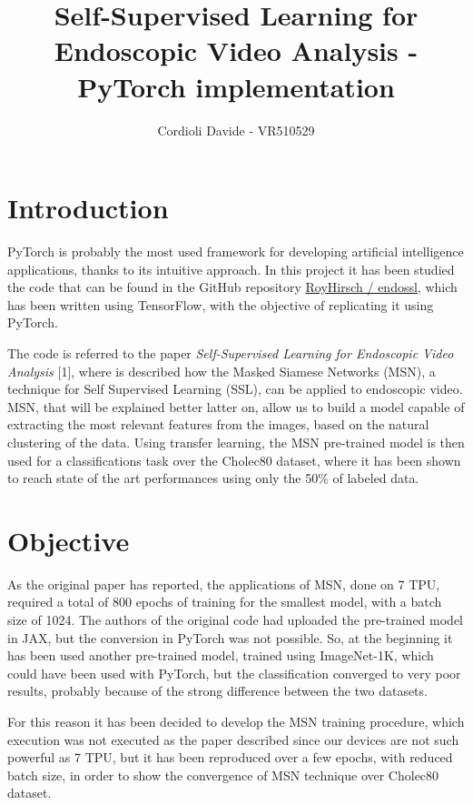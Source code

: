 \documentclass[column]{article}
\title{Self-Supervised Learning for Endoscopic Video Analysis - PyTorch implementation}
\author{Cordioli Davide - VR510529}
\date{}
\begin{document}
	
	\maketitle
	
	\begin{multicols}{2}
		
	\section{Introduction}
	
	PyTorch is probably the most used framework for developing artificial intelligence applications, thanks to its intuitive approach. In this project it has been studied the code that can be found in the GitHub repository  \href{https://github.com/royhirsch/endossl}{RoyHirsch / endossl}, which has been written using TensorFlow, with the objective of replicating it using PyTorch.
	
	The code is referred to the paper \textit{Self-Supervised Learning for Endoscopic Video Analysis} [1], where is described how the Masked Siamese Networks (MSN), a technique for Self Supervised Learning (SSL), can be applied to endoscopic video. MSN, that will be explained better latter on, allow us to build a model capable of extracting the most relevant features from the images, based on the natural clustering of the data. Using transfer learning, the MSN pre-trained model is then used for a classifications task over the Cholec80 dataset, where it has been shown to reach state of the art performances using only the 50\% of labeled data.
	
	\section{Objective}
	
	As the original paper has reported, the applications of MSN, done on 7 TPU, required a total of 800 epochs of training for the smallest model, with a batch size of 1024. The authors of the original code had uploaded the pre-trained model in JAX, but the conversion in PyTorch was not possible. So, at the beginning it has been used another pre-trained model, trained using ImageNet-1K, which could have been used with PyTorch, but the classification converged to very poor results, probably because of the strong difference between the two datasets.
	
	For this reason it has been decided to develop the MSN training procedure, which execution was not executed as the paper described since our devices are not such powerful as 7 TPU, but it has been reproduced over a few epochs, with reduced batch size, in order to show the convergence of MSN technique over Cholec80 dataset.
	

\end{multicols}
\end{document}
